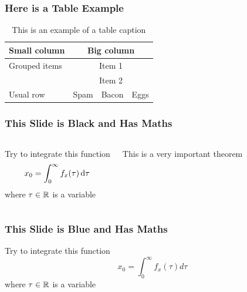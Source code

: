 \documentclass[fleqn]{qu-slides}
\begin{document}

\SlideWhite
\begin{frame}
    \frametitle{Here is a Table Example}
    \begin{table}
        \caption{This is an example of a table caption}
        \flushleft
        \begin{tabular}{lccc}
            \toprule
                \bf Small column & \multicolumn{3}{c}{\bf Big column} \\
            \midrule
                Grouped items & \multicolumn{3}{c}{Item 1} \\
            \cmidrule{2-4}
                & \multicolumn{3}{c}{Item 2} \\
            \midrule
                Usual row & Spam & Bacon & Eggs \\
            \bottomrule
        \end{tabular}
    \end{table}
\end{frame}




\SlideBlack
\begin{frame}
    \frametitle{This Slide is Black and Has Maths}
    \begin{columns}
        Try to integrate this function
        \begin{equation*}
            x_0=\int_0^\infty f_x(\tau)\mathop{}\!\textup{d}\tau
        \end{equation*}
        where $\tau\in\mathbb R$ is a variable
        \begin{thm}
            This is a very important theorem
        \end{thm}
    \end{columns}
\end{frame}


\SlideBlue
\begin{frame}
    \frametitle{This Slide is Blue and Has Maths}
    Try to integrate this function
    \begin{equation*}
        x_0=\int_0^\infty f_x(\tau)d\tau
    \end{equation*}
    where $\tau\in\mathbb R$ is a variable
\end{frame}
\end{document}
